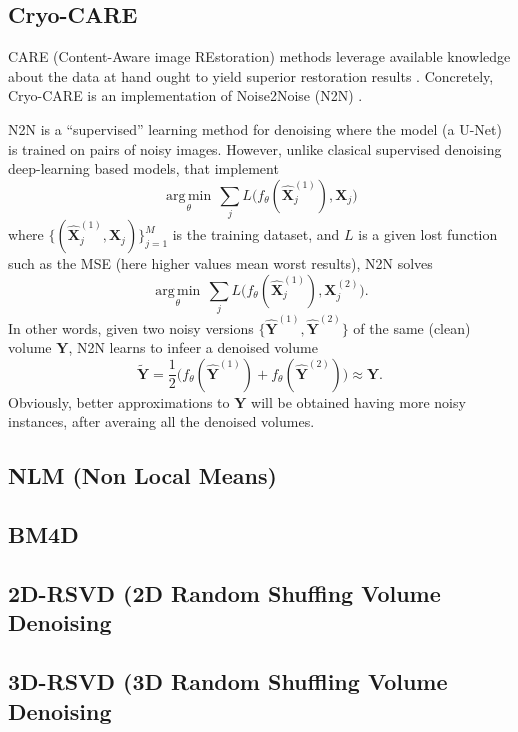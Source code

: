 \documentclass{article}
\begin{document}




\subsection{Cryo-CARE \cite{buchholz2019cryo}}
CARE (Content-Aware image REstoration) methods leverage
available knowledge about the data at hand ought to yield superior
restoration results \cite{weigert2018content}. Concretely, Cryo-CARE
is an implementation of Noise2Noise (N2N) \cite{lehtinen2018noise2noise}.

N2N is a ``supervised'' learning method for denoising where the model
(a U-Net) is trained on pairs of noisy images. However, unlike
clasical supervised denoising deep-learning based models, that
implement
\begin{equation}
  \underset{\theta}{\operatorname{arg\,min}} \, \sum_j L \big(f_\theta(\hat{\mathbf X}_j^{(1)}), {\mathbf X}_j\big)
\end{equation}
where $\{(\hat{\mathbf X}_j^{(1)}, {\mathbf X}_j)\}_{j=1}^M$ is the training
dataset, and $L$ is a given lost function such as the MSE (here higher
values mean worst results), N2N solves
\begin{equation}
  \underset{\theta}{\operatorname{arg\,min}} \, \sum_j L \big(f_\theta(\hat{\mathbf X}_j^{(1)}), {\mathbf X}_j^{(2)}\big).
\end{equation}
In other words, given two noisy versions
$\{\hat{\mathbf Y}^{(1)}, \hat{\mathbf Y}^{(2)}\}$ of the same (clean)
volume ${\mathbf Y}$, N2N learns to infeer a denoised volume
\begin{equation}
  \tilde{\mathbf Y}=\frac{1}{2}\big(f_\theta(\hat{\mathbf Y}^{(1)})+f_\theta(\hat{\mathbf Y}^{(2)})\big)\approx{\mathbf Y}.
\end{equation}
Obviously, better approximations to ${\mathbf Y}$ will be obtained
having more noisy instances, after averaing all the denoised volumes.

\subsection{NLM (Non Local Means)} 

\subsection{BM4D}

\subsection{2D-RSVD (2D Random Shuffing Volume Denoising}

\subsection{3D-RSVD (3D Random Shuffling Volume Denoising}




\end{document}

